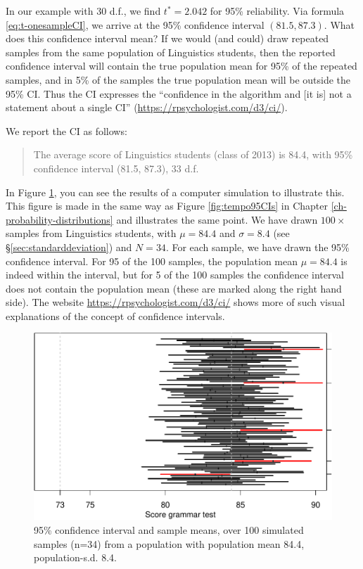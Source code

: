 \documentclass[
]{book}
\begin{document}
In our example with 30 d.f., we find \(t^*=2.042\) for 95\%
reliability. Via formula
\eqref{eq:t-onesampleCI}, we arrive at the 95\%
confidence interval \((81.5, 87.3)\).
What does this confidence interval mean?
If we would (and could) draw repeated samples from the same population of Linguistics students, then the reported confidence interval will contain the true population mean for 95\% of the repeated samples, and in 5\% of the samples the true population mean will be outside the 95\% CI. Thus the CI expresses the ``confidence in the algorithm and {[}it is{]} not a statement about a single CI'' (\url{https://rpsychologist.com/d3/ci/}).

We report the CI as follows:

\begin{quote}
The average score of Linguistics students (class of 2013) is
84.4, with 95\% confidence interval (81.5, 87.3), 33 d.f.
\end{quote}

In Figure \ref{fig:gramm2013CIs}, you can see the results of
a computer simulation to illustrate this. This figure is made in the same way as Figure
\ref{fig:tempo95CIs} in Chapter \ref{ch-probability-distributions} and
illustrates the same point. We have drawn \(100\times\) samples from Linguistics students,
with \(\mu=84.4\) and \(\sigma=8.4\) (see §\ref{sec:standarddeviation}) and \(N=34\).
For each sample, we have drawn the 95\%
confidence interval. For 95 of the 100 samples, the population mean \(\mu=84.4\)
is indeed within the interval, but for 5 of the 100 samples the confidence interval does not contain the population mean (these are marked along the right hand side). The website \url{https://rpsychologist.com/d3/ci/} shows more of such visual explanations of the concept of confidence intervals.

\begin{figure}
\centering
\includegraphics{QMS-EN_files/figure-latex/gramm2013CIs-1.pdf}
\caption{\label{fig:gramm2013CIs}95\% confidence interval and sample means, over 100 simulated samples (n=34) from a population with population mean 84.4, population-s.d. 8.4.}
\end{figure}
\end{document}
